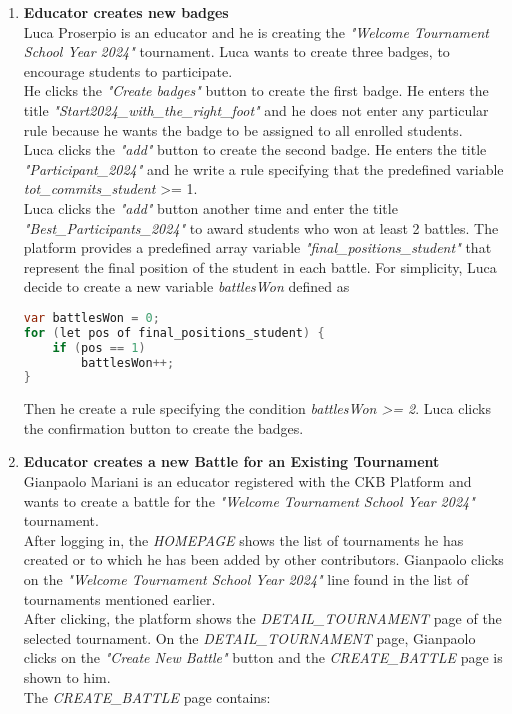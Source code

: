 \begin{enumerate}
	\item \textbf{Educator creates new badges}\\
	      Luca Proserpio is an educator and he is creating the \emph{"Welcome Tournament School Year 2024"} tournament.
	      Luca wants to create three badges, to encourage students to participate.\\
	      He clicks the \emph{"Create badges"} button to create the first badge.
	      He enters the title \emph{"Start2024_with_the_right_foot"} and he does not enter any particular rule because he wants the badge to be assigned to all enrolled students.\\
	      Luca clicks the \emph{"add"} button to create the second badge.
	      He enters the title \emph{"Participant_2024"} and he write a rule specifying that the predefined variable \emph{tot_commits_student} >= 1.\\
	      Luca clicks the \emph{"add"} button another time and enter the title \emph{"Best_Participants_2024"} to award students who won at least 2 battles.
	      The platform provides a predefined array variable \emph{"final_positions_student"} that represent the final position of the student in each battle.
	      For simplicity, Luca decide to create a new variable \emph{battlesWon} defined as
	      \begin{lstlisting}[language=java, morekeywords={var, let, of}, keywordstyle=\color{blue}]
var battlesWon = 0;
for (let pos of final_positions_student) {
	if (pos == 1)
		battlesWon++;
}
		  \end{lstlisting}
	      Then he create a rule specifying the condition \emph{battlesWon >= 2}.
	      Luca clicks the confirmation button to create the badges.


	\item \textbf{Educator creates a new Battle for an Existing Tournament}\\
	      Gianpaolo Mariani is an educator registered with the CKB Platform and wants to create a battle for the \emph{"Welcome Tournament School Year 2024"} tournament.\\
	      After logging in, the \emph{HOMEPAGE} shows the list of tournaments he has created or to which he has been added by other contributors. Gianpaolo clicks on the \emph{"Welcome
		      Tournament School Year 2024"} line found in the list of tournaments mentioned earlier.\\
	      After clicking, the platform shows the \emph{DETAIL\_TOURNAMENT} page of the selected tournament.
	      On the \emph{DETAIL\_TOURNAMENT} page, Gianpaolo clicks on the \emph{"Create New Battle"} button and the \emph{CREATE\_BATTLE} page is shown to him.\\
	      The \emph{CREATE\_BATTLE} page contains:


\end{enumerate}
